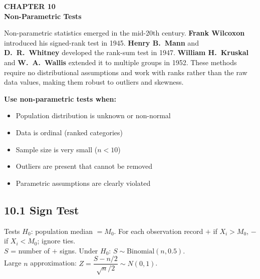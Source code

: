 \documentclass[12pt]{article}
\begin{document}
\newpage

\begin{tcolorbox}[enhanced,arc=0pt,boxrule=0pt,colback=primary,colframe=primary,
  left=16pt,right=16pt,top=14pt,bottom=10pt,borderline south={4pt}{0pt}{accent}]
  {\color{accent!70}\small\bfseries CHAPTER 10}\\[4pt]
  {\LARGE\bfseries\color{white}Non-Parametric Tests}
\end{tcolorbox}
\vspace{10pt}

\begin{histbox}
Non-parametric statistics emerged in the mid-20th century. \textbf{Frank Wilcoxon} introduced his signed-rank test in 1945. \textbf{Henry B.\ Mann} and \textbf{\mbox{D.\ R.\ Whitney}} developed the rank-sum test in 1947. \textbf{William H.\ Kruskal} and \textbf{W.\ A.\ Wallis} extended it to multiple groups in 1952. These methods require no distributional assumptions and work with ranks rather than the raw data values, making them robust to outliers and skewness.
\end{histbox}

\begin{keybox}
\textbf{Use non-parametric tests when:}
\begin{itemize}[noitemsep]
  \item Population distribution is unknown or non-normal
  \item Data is ordinal (ranked categories)
  \item Sample size is very small ($n<10$)
  \item Outliers are present that cannot be removed
  \item Parametric assumptions are clearly violated
\end{itemize}
\end{keybox}

\subsection{10.1 Sign Test}

\begin{defbox}
Tests $H_0$: population median $=M_0$. For each observation record $+$ if $X_i>M_0$, $-$ if $X_i<M_0$; ignore ties.\\[4pt]
$S$ = number of $+$ signs. Under $H_0$: $S\sim\text{Binomial}(n,0.5)$.\\[4pt]
Large $n$ approximation: $Z=\dfrac{S-n/2}{\sqrt{n}/2}\sim N(0,1)$.
\end{defbox}
\end{document}
